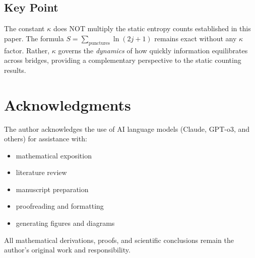 \documentclass[11pt, a4paper]{article}
\theoremstyle{plain}
\theoremstyle{definition}
\theoremstyle{remark}
\begin{document}
\subsection{Key Point}

The constant $\kappa$ does NOT multiply the static entropy counts established in this paper. The formula $S = \sum_{\text{punctures}} \ln(2j + 1)$ remains exact without any $\kappa$ factor. Rather, $\kappa$ governs the \emph{dynamics} of how quickly information equilibrates across bridges, providing a complementary perspective to the static counting results.

\section*{Acknowledgments}
The author acknowledges the use of AI language models (Claude, GPT-o3, and others) for assistance with:

\begin{itemize}
  \item mathematical exposition
  \item literature review
  \item manuscript preparation
  \item proofreading and formatting
  \item generating figures and diagrams
\end{itemize}

All mathematical derivations, proofs, and scientific conclusions remain the author's original work and responsibility.
\end{document}
